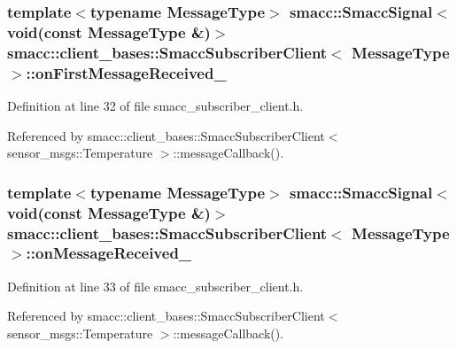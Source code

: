 \subsubsection[{\texorpdfstring{on\+First\+Message\+Received\+\_\+}{onFirstMessageReceived_}}]{\setlength{\rightskip}{0pt plus 5cm}template$<$typename Message\+Type$>$ {\bf smacc\+::\+Smacc\+Signal}$<$void(const Message\+Type \&)$>$ {\bf smacc\+::client\+\_\+bases\+::\+Smacc\+Subscriber\+Client}$<$ Message\+Type $>$\+::on\+First\+Message\+Received\+\_\+}\hypertarget{classsmacc_1_1client__bases_1_1SmaccSubscriberClient_af1ec022065a2df3faabe40768f8b2e22}{}\label{classsmacc_1_1client__bases_1_1SmaccSubscriberClient_af1ec022065a2df3faabe40768f8b2e22}


Definition at line 32 of file smacc\+\_\+subscriber\+\_\+client.\+h.



Referenced by smacc\+::client\+\_\+bases\+::\+Smacc\+Subscriber\+Client$<$ sensor\+\_\+msgs\+::\+Temperature $>$\+::message\+Callback().

\subsubsection[{\texorpdfstring{on\+Message\+Received\+\_\+}{onMessageReceived_}}]{\setlength{\rightskip}{0pt plus 5cm}template$<$typename Message\+Type$>$ {\bf smacc\+::\+Smacc\+Signal}$<$void(const Message\+Type \&)$>$ {\bf smacc\+::client\+\_\+bases\+::\+Smacc\+Subscriber\+Client}$<$ Message\+Type $>$\+::on\+Message\+Received\+\_\+}\hypertarget{classsmacc_1_1client__bases_1_1SmaccSubscriberClient_a04469577ec95e2f6c04cd4dca87dfc08}{}\label{classsmacc_1_1client__bases_1_1SmaccSubscriberClient_a04469577ec95e2f6c04cd4dca87dfc08}


Definition at line 33 of file smacc\+\_\+subscriber\+\_\+client.\+h.



Referenced by smacc\+::client\+\_\+bases\+::\+Smacc\+Subscriber\+Client$<$ sensor\+\_\+msgs\+::\+Temperature $>$\+::message\+Callback().

